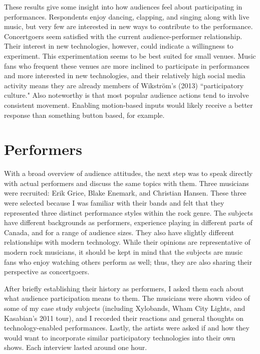 These results give some insight into how audiences feel about participating in performances. Respondents enjoy dancing, clapping, and singing along with live music, but very few are interested in new ways to contribute to the performance. Concertgoers seem satisfied with the current audience-performer relationship. Their interest in new technologies, however, could indicate a willingness to experiment. This experimentation seems to be best suited for small venues. Music fans who frequent these venues are more inclined to participate in performances and more interested in new technologies, and their relatively high social media activity means they are already members of Wikstr\"{o}m's (2013) ``participatory culture." Also noteworthy is that most popular audience actions tend to involve consistent movement. Enabling motion-based inputs would likely receive a better response than something button based, for example.



\section{Performers}

With a broad overview of audience attitudes, the next step was to speak directly with actual performers and discuss the same topics with them. Three musicians were recruited: Erik Grice, Blake Enemark, and Christian Hansen. These three were selected because I was familiar with their bands and felt that they represented three distinct performance styles within the rock genre. The subjects have different backgrounds as performers, experience playing in different parts of Canada, and for a range of audience sizes. They also have slightly different relationships with modern technology. While their opinions are representative of modern rock musicians, it should be kept in mind that the subjects are music fans who enjoy watching others perform as well; thus, they are also sharing their perspective as concertgoers.

After briefly establishing their history as performers, I asked them each about what audience participation means to them. The musicians were shown video of some of my case study subjects (including Xylobands, Wham City Lights, and Kasabian's 2011 tour), and I recorded their reactions and general thoughts on technology-enabled performances. Lastly, the artists were asked if and how they would want to incorporate similar participatory technologies into their own shows. Each interview lasted around one hour.

